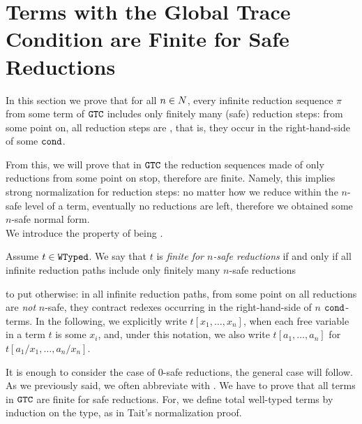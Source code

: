 
\section{Terms with the Global Trace Condition are Finite for Safe Reductions}

\label{section-finite-safe-reductions}
In this section we prove that for all $n \in {N}$, 
every infinite reduction sequence $\pi$ 
from some term of ${\tt GTC}$ includes
only finitely many  (safe) reduction steps:
from some point on, all reduction steps are ,
that is, they occur in the right-hand-side of some ${\tt cond}$.
    
From this, we will prove that in ${\tt GTC}$ the reduction sequences made of only  reductions from some point on stop,
therefore are finite. Namely, this implies strong normalization for  reduction steps:
no matter how we reduce within the $n$-safe level of a term, 
eventually no reductions are left, therefore we obtained some $n$-safe normal 
form.
\\

We introduce the property of being .

\begin{definition}
\label{definition-finite-n-safe-reduction}
Assume $t \in {\tt WTyped}$. 
We say that $t$ is \emph{finite for $n$-safe reductions} if and only if 
all infinite reduction paths include only finitely many $n$-safe reductions
\end{definition}

to put otherwise: in all infinite reduction paths, from some point on all reductions
are \emph{not} $n$-safe, they contract redexes occurring in the right-hand-side of
$n$ ${\tt cond}$-terms. In the following, we explicitly write $t[x_1,\ldots,x_n]$,
when each free variable in a term $t$ is some $x_i$, 
and, under this notation, we also write $t[a_1,\ldots,a_n]$ for 
$t[a_1/x_1,\ldots,a_n/x_n]$. 

It is enough to consider the case of $0$-safe reductions, 
the general case will follow. 
As we previously said, 
we often abbreviate  with .
We have to prove that all terms in ${\tt GTC}$ are finite for safe reductions. 
For, we define total well-typed terms by induction on the type, as in Tait's normalization proof.



